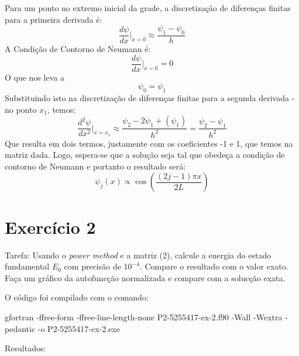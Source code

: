 \documentclass[12pt, a4paper]{article} %
\begin{document}
        Para um ponto no extremo inicial da grade, a discretiza\c{c}\~ao de diferen\c{c}as finitas para a primeira derivada \'e:
        \begin{equation}
            \frac{d\psi}{dx} \bigg|_{x=0} \approx \frac{\psi_1 - \psi_0}{h}
        \end{equation}
        A Condi\c{c}\~ao de Contorno de Neumann é:
        \begin{equation}
            \frac{d\psi}{dx} \bigg|_{x=0} = 0
        \end{equation}
        O que nos leva a
        \begin{equation}
            \psi_0 = \psi_1
        \end{equation}
        Substituindo isto na discretiza\c{c}\~ao de diferen\c{c}as finitas para a segunda derivada - no ponto $x_1$, temos:
        \begin{equation}
            \frac{d^2\psi}{dx^2} \bigg|_{x=x_1} \approx \frac{\psi_2 - 2\psi_1 + (\psi_1)}{h^2} = \frac{\psi_2 - \psi_1}{h^2}
        \end{equation}
        Que resulta em dois termos, justamente com os coeficientes -1 e 1, que temos na matriz dada.
        Logo, espera-se que a solu\c{c}\~ao seja tal que obede\c{c}a a condi\c{c}\~ao de contorno de Neumann e portanto o resultado ser\'a:
        \begin{equation*}
            \psi_{j}(x) \propto \cos\left(\frac{(2j-1)\pi x}{2L}\right)
        \end{equation*}

    \section{Exercício 2}

        Tarefa: Usando o \textit{power method} e a matriz (2), calcule a energia do estado fundamental $E_{0}$ com precis\~ao de $10^{-4}$. Compare o resultado com o valor exato. Fa\c{c}a um gr\'afico da autofunc\c{c}\~ao normalizada e compare com a soluc\c{c}\~ao exata.

        O c\'odigo foi compilado com o comando:

    gfortran -ffree-form -ffree-line-length-none P2-5255417-ex-2.f90 -Wall -Wextra -pedantic -o P2-5255417-ex-2.exe

        Resultados:
\end{document}
